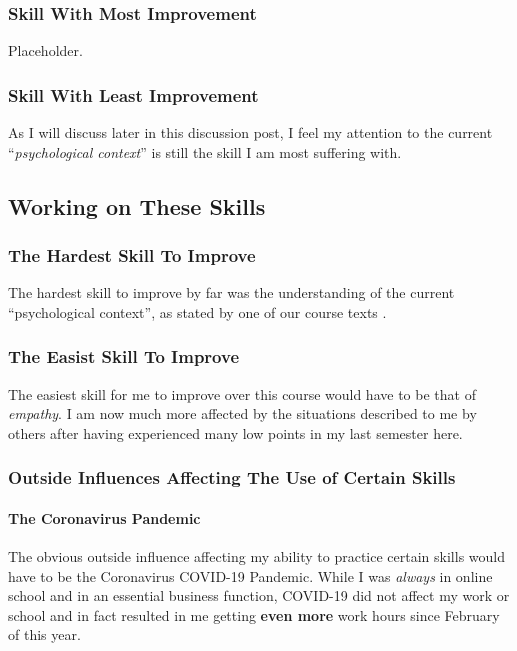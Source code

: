 \documentclass[stu,12pt]{apa7}
\begin{document}
      \subsubsection{Skill With Most Improvement}
        Placeholder.
      \subsubsection{Skill With Least Improvement}
        As I will discuss later in this discussion post, I feel my attention to
          the current ``\textit{psychological context}'' is still the skill
          I am most suffering with.


    \subsection{Working on These Skills}
      \subsubsection{The Hardest Skill To Improve}
        The hardest skill to improve by far was the understanding of the current
          ``psychological context'', as stated by one of our course texts
          \parencite{noauthor_communication_2013}.
      \subsubsection{The Easist Skill To Improve}
        The easiest skill for me to improve over this course would have to be
          that of \textit{empathy}. I am now much more affected by the
          situations described to me by others after having experienced many
          low points in my last semester here.
      \subsubsection{Outside Influences Affecting The Use of Certain Skills}
        \paragraph{The Coronavirus Pandemic}
          The obvious outside influence affecting my ability to practice certain
            skills would have to be the Coronavirus COVID-19 Pandemic. While
            I was \textit{always} in online school and in an essential business
            function, COVID-19 did not affect my work or school and in fact
            resulted in me getting \textbf{even more} work hours since February
            of this year.
\end{document}
